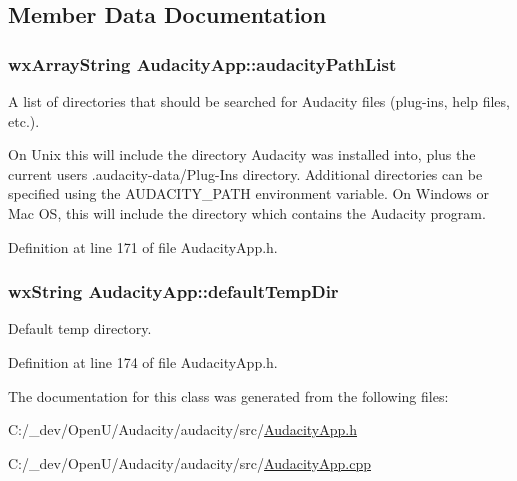 \subsection{Member Data Documentation}
\subsubsection[{\texorpdfstring{audacity\+Path\+List}{audacityPathList}}]{\setlength{\rightskip}{0pt plus 5cm}wx\+Array\+String Audacity\+App\+::audacity\+Path\+List}\hypertarget{class_audacity_app_a04d9d13de407ee9c61e9e74c8bdd9d38}{}\label{class_audacity_app_a04d9d13de407ee9c61e9e74c8bdd9d38}


A list of directories that should be searched for Audacity files (plug-\/ins, help files, etc.). 

On Unix this will include the directory Audacity was installed into, plus the current user\textquotesingle{}s .audacity-\/data/\+Plug-\/\+Ins directory. Additional directories can be specified using the A\+U\+D\+A\+C\+I\+T\+Y\+\_\+\+P\+A\+TH environment variable. On Windows or Mac OS, this will include the directory which contains the Audacity program. 

Definition at line 171 of file Audacity\+App.\+h.

\subsubsection[{\texorpdfstring{default\+Temp\+Dir}{defaultTempDir}}]{\setlength{\rightskip}{0pt plus 5cm}wx\+String Audacity\+App\+::default\+Temp\+Dir}\hypertarget{class_audacity_app_a841018e439ee4c150680676585e71a1b}{}\label{class_audacity_app_a841018e439ee4c150680676585e71a1b}


Default temp directory. 



Definition at line 174 of file Audacity\+App.\+h.



The documentation for this class was generated from the following files\+:\begin{DoxyCompactItemize}
\item 
C\+:/\+\_\+dev/\+Open\+U/\+Audacity/audacity/src/\hyperlink{_audacity_app_8h}{Audacity\+App.\+h}\item 
C\+:/\+\_\+dev/\+Open\+U/\+Audacity/audacity/src/\hyperlink{_audacity_app_8cpp}{Audacity\+App.\+cpp}\end{DoxyCompactItemize}
